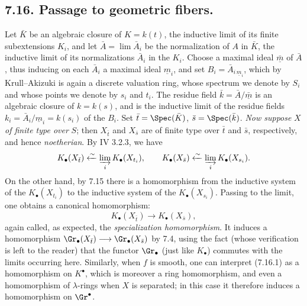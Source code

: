 %
\subsection*{7.16. Passage to geometric fibers.}
Let \(\bar K\) be an algebraic closure of \(K=k(t)\), the inductive limit of its finite subextensions \(K_i\), and let \(\bar A=\lim \bar A_i\) be the normalization of \(A\) in \(\bar K\), the inductive limit of its normalizations \(\bar A_i\) in the \(K_i\). Choose a maximal ideal \(\bar{\underline{m}}\) of \(\bar A\), thus inducing on each \(\bar A_i\) a maximal ideal \(\underline{m}_i\), and set \(B_i=\bar A_{i\,\underline{m}_i}\), which by Krull--Akizuki is again a discrete valuation ring, whose spectrum we denote by \(S_i\) and whose points we denote by \(s_i\) and \(t_i\). The residue field \(\bar k=\bar A/\bar{\underline{m}}\) is an algebraic closure of \(k=k(s)\), and is the inductive limit of the residue fields \(k_i=\bar A_i/\underline{m}_i=k(s_i)\) of the \(B_i\). Set \(\bar t=\Spec(\bar K)\), \(\bar s=\Spec(\bar k)\). \emph{Now suppose} \(X\) \emph{of finite type over} \(S\); then \(X_{\bar t}\) and \(X_{\bar s}\) are of finite type over \(\bar t\) and \(\bar s\), respectively, and hence \emph{noetherian}. By IV 3.2.3, we have
\[
  K_\bullet(X_{\bar t})\xleftarrow{\sim}\varinjlim_i K_\bullet(X_{t_i}),
  \qquad
  K_\bullet(X_{\bar s})\xleftarrow{\sim}\varinjlim_i K_\bullet(X_{s_i}).
\]
On the other hand, by 7.15 there is a homomorphism from the inductive system of the \(K_\bullet(X_{t_i})\) to the inductive system of the \(K_\bullet(X_{s_i})\). Passing to the limit, one obtains a canonical homomorphism:
\begin{equation}\tag{7.16.1}
  K_\bullet(X_{\bar t})\longrightarrow K_\bullet(X_{\bar s}),
\end{equation}
again called, as expected, the \emph{specialization homomorphism}. It induces a homomorphism \(\Gr_\bullet(X_{\bar t})\longrightarrow \Gr_\bullet(X_{\bar s})\) by 7.4, using the fact (whose verification is left to the reader) that the functor \(\Gr_\bullet\) (just like \(K_\bullet\)) commutes with the limits occurring here. Similarly, when \(f\) is smooth, one can interpret (7.16.1) as a homomorphism on \(K^\bullet\), which is moreover a ring homomorphism, and even a homomorphism of \(\lambda\)-rings when \(X\) is separated; in this case it therefore induces a homomorphism on \(\Gr^\bullet\).


